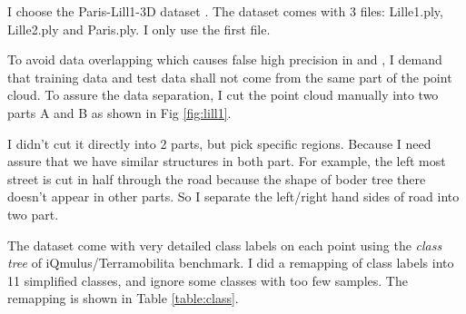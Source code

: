 \documentclass{article}
\begin{document}
I choose the Paris-Lill1-3D dataset \cite{2017arXiv171200032R}. The dataset comes with 3 files: Lille1.ply, Lille2.ply and Paris.ply. I only use the first file.

To avoid data overlapping which causes false high precision in \cite{hackel2016fast} and \cite{weinmann2015}, I demand that training data and test data shall not come from the same part of the point cloud. To assure the data separation, I cut the point cloud manually into two parts A and B as shown in Fig \ref{fig:lill1}.


I didn't cut it directly into 2 parts, but pick specific regions. Because I need assure that we have similar structures in both part. For example, the left most street is cut in half through the road because the shape of boder tree there doesn't appear in other parts. So I separate the left/right hand sides of road into two part.

The dataset come with very detailed class labels on each point using the \textit{class tree} of iQmulus/Terramobilita benchmark. I did a remapping of class labels into 11 simplified classes, and ignore some classes with too few samples. The remapping is shown in Table \ref{table:class}.
\end{document}
